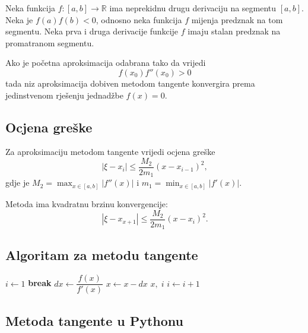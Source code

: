 Neka funkcija $f: [a,b] \to \mathbb{R}$ ima neprekidnu drugu derivaciju na
segmentu $[a,b]$. Neka je $f(a)f(b) < 0$, odnosno neka funkcija $f$ mijenja
predznak na tom segmentu.
Neka prva i druga derivacije funkcije $f$ imaju stalan predznak na promatranom
segmentu.

Ako je početna aproksimacija odabrana tako da vrijedi
$$
    f(x_0)f''(x_0) > 0
$$
tada niz aproksimacija dobiven metodom tangente konvergira prema jedinstvenom
rješenju jednadžbe $f(x) = 0$.

\subsection{Ocjena greške}

Za aproksimaciju metodom tangente vrijedi ocjena greške
$$
|\xi - x_i| \leq \dfrac{M_2}{2m_1}(x-x_{i-1})^2,
$$
gdje je $M_2 = \max_{x\in [a,b]}|f''(x)|$ i $m_1 = \min_{x\in [a,b]}|f'(x)|$.

Metoda ima kvadratnu brzinu konvergencije:
$$
|\xi - x_{x+1}| \leq \dfrac{M_2}{2m_1}(x-x_i)^2.
$$

\begin{multicols}{2}
    
\subsection{Algoritam za metodu tangente}

\begin{algorithmic}
 
\EndIf
{}
    \State $i \gets 1$
            \State \textbf{break} 
        \EndIf
        \State $dx \gets \dfrac{f(x)}{f'(x)}$
        \State $x \gets x - dx$
            \State \Return $x,\;i$
        \Else
            \State $i \gets i + 1$
        \EndIf
    \EndWhile
\EndFunction
\end{algorithmic}

\columnbreak

\subsection{Metoda tangente u Pythonu}



\end{multicols}